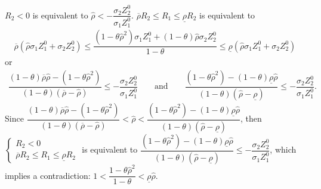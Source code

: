 \documentclass[10pt]{article}
\begin{document}
$ R_2 < 0 $ is equivalent to $ {\hat \rho} < - \dfrac{\sigma_2 Z_2^0}{\sigma_1 Z_1^0} $.
$ \overline{\rho} R_2 \leqslant R_1 \leqslant \underline{\rho} R_2 $ is equivalent to 
\begin{eqnarray*}
\overline{\rho} ({\hat \rho} \sigma_1 Z_1^0 + \sigma_2 Z_2^0) \leqslant \dfrac{(1 - \theta {\hat \rho}^2) \sigma_1 Z_1^0 + (1 - \theta) {\hat \rho} \sigma_2 Z_2^0}{1 - \theta} \leqslant \underline{\rho} ({\hat \rho} \sigma_1 Z_1^0 + \sigma_2 Z_2^0)
\end{eqnarray*}
or
\begin{eqnarray*}
\dfrac{(1 - \theta) \overline{\rho} {\hat \rho} - (1 - \theta {\hat \rho}^2)}{(1 - \theta) (\overline{\rho} - {\hat \rho})} \leqslant - \dfrac{\sigma_2 Z_2^0}{\sigma_1 Z_1^0} \qquad \text{and} \qquad \dfrac{(1 - \theta {\hat \rho}^2) - (1 - \theta) \underline{\rho} {\hat \rho}}{(1 - \theta) ({\hat \rho} - \underline{\rho})} \leqslant - \dfrac{\sigma_2 Z_2^0}{\sigma_1 Z_1^0}.
\end{eqnarray*}
Since $ \dfrac{(1 - \theta) \overline{\rho} {\hat \rho} - (1 - \theta {\hat \rho}^2)}{(1 - \theta) (\overline{\rho} - {\hat \rho})} < {\hat \rho} < \dfrac{(1 - \theta {\hat \rho}^2) - (1 - \theta) \underline{\rho} {\hat \rho}}{(1 - \theta) ({\hat \rho} - \underline{\rho})} $, then $ \left\{ \begin{matrix} R_2 < 0 \\ \overline{\rho} R_2 \leqslant R_1 \leqslant \underline{\rho} R_2 \end{matrix} \right. $ is equivalent to $ \dfrac{(1 - \theta {\hat \rho}^2) - (1 - \theta) \underline{\rho} {\hat \rho}}{(1 - \theta) ({\hat \rho} - \underline{\rho})} \leqslant - \dfrac{\sigma_2 Z_2^0}{\sigma_1 Z_1^0} $, which implies a contradiction: $ 1 < \dfrac{1 - \theta {\hat \rho}^2}{1 - \theta} < \underline{\rho} {\hat \rho} $.
\end{document}
